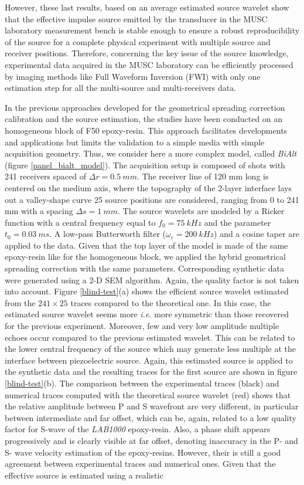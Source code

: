\documentclass[manuscript,revised]{geophysics}
\newcommand{\twod}{2-D }
\newcommand{\bialt}{\textit{BiAlt} }
\begin{document}
\noindent However, these last results, based on an average estimated source wavelet show that the effective impulse source emitted by the transducer in the MUSC laboratory measurement bench is stable enough to ensure a robust reproducibility of the source for a complete physical experiment with multiple source and receiver positions. Therefore, concerning the key issue of the source knowledge, experimental data acquired in the MUSC laboratory can be efficiently processed by imaging methods like Full Waveform Inversion (FWI) with only one estimation step for all the multi-source and multi-receivers data.

\noindent In the previous approaches developed for the geometrical spreading correction calibration and the source estimation, the studies have been conducted on an homogeneous block of F50 epoxy-resin. This approach facilitates developments and applications but limits the validation to a simple media with simple acquisition geometry. Thus, we consider here a more complex model, called \bialt (figure \ref{panel_bialt_model}). The acquisition setup is composed of shots with 241 receivers spaced of $\Delta r=0.5\ mm$. The receiver line of 120 mm long is centered on the medium axis, where the topography of the 2-layer interface lays out a valley-shape curve 25 source positions are considered, ranging from 0 to 241 mm with a spacing $\Delta s=1\ mm$. The source wavelets are modeled by a Ricker function with a central frequency equal to $f_{0}=75\ kHz$ and the parameter $t_{0}=0.03\ ms$. A low-pass Butterworth filter ($\omega_{c}=200\ kHz$) and a cosine taper are applied to the data. Given that the top layer of the model is made of the same epoxy-resin like for the homogeneous block, we applied the hybrid geometrical spreading correction with the same parameters. Corresponding synthetic data were generated using a \twod  SEM algorithm. Again, the quality factor is not taken into account. Figure \ref{blind-test}(a) shows the efficient source wavelet estimated from the $241 \times 25$ traces compared to the theoretical one. In this case, the estimated source wavelet seems more \textit{i.e.} more symmetric than those recovered for the previous experiment. Moreover, few and very low amplitude multiple echoes occur compared to the previous estimated wavelet. This can be related to the lower central frequency of the source which may generate less multiple at the interface between piezoelectric source. Again, this estimated source is applied to the synthetic data and the resulting traces  for the first source are shown in figure \ref{blind-test}(b). The comparison between the experimental traces (black) and numerical traces computed with the theoretical source wavelet (red) shows that the relative amplitude between P and S wavefront are very different, in particular between intermediate and far offset, which can be, again, related to a low quality factor for S-wave of the \textit{LAB1000} epoxy-resin. Also, a phase shift appears progressively and is clearly visible at far offset, denoting inaccuracy in the P- and S- wave velocity estimation of the epoxy-resins. However, their is still a good agreement between experimental traces and numerical ones. Given that the effective source is estimated using a realistic 
\end{document}
